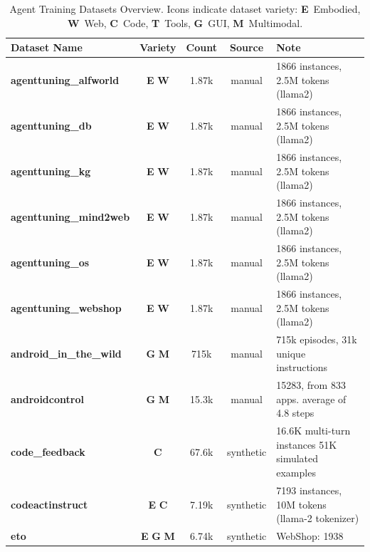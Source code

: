 \begin{table}[t]
    \caption{Agent Training Datasets Overview. Icons indicate dataset variety: \textbf{E}~Embodied, \textbf{W}~Web, \textbf{C}~Code, \textbf{T}~Tools, \textbf{G}~GUI, \textbf{M}~Multimodal.}
    \centering
    \small
    \setlength{\tabcolsep}{3pt}
    \begin{tabular*}{\textwidth}{@{\extracolsep{\fill}}l c c c p{5cm}}
        \toprule
        \textbf{Dataset Name} & \textbf{Variety} & \textbf{Count} & \textbf{Source} & \textbf{Note} \\
        \midrule
        \textbf{agenttuning\_alfworld \cite{agenttuning_alfworld_2310_12823}} & \textbf{E} \textbf{W} & 1.87k & manual & 1866 instances, 2.5M tokens (llama2) \\
        \textbf{agenttuning\_db \cite{agenttuning_db_2310_12823}} & \textbf{E} \textbf{W} & 1.87k & manual & 1866 instances, 2.5M tokens (llama2) \\
        \textbf{agenttuning\_kg \cite{agenttuning_kg_2310_12823}} & \textbf{E} \textbf{W} & 1.87k & manual & 1866 instances, 2.5M tokens (llama2) \\
        \textbf{agenttuning\_mind2web \cite{agenttuning_mind2web_2310_12823}} & \textbf{E} \textbf{W} & 1.87k & manual & 1866 instances, 2.5M tokens (llama2) \\
        \textbf{agenttuning\_os \cite{agenttuning_os_2310_12823}} & \textbf{E} \textbf{W} & 1.87k & manual & 1866 instances, 2.5M tokens (llama2) \\
        \textbf{agenttuning\_webshop \cite{agenttuning_webshop_2310_12823}} & \textbf{E} \textbf{W} & 1.87k & manual & 1866 instances, 2.5M tokens (llama2) \\
        \textbf{android\_in\_the\_wild \cite{android_in_the_wild_2307_10088}} & \textbf{G} \textbf{M} & 715k & manual & 715k episodes, 31k unique instructions \\
        \textbf{androidcontrol \cite{androidcontrol_2406_03679}} & \textbf{G} \textbf{M} & 15.3k & manual & 15283, from 833 apps. average of 4.8 steps \\
        \textbf{code\_feedback} & \textbf{C} & 67.6k & synthetic & 16.6K multi-turn instances
51K simulated examples \\
        \textbf{codeactinstruct \cite{codeactinstruct_2402_01030}} & \textbf{E} \textbf{C} & 7.19k & synthetic & 7193 instances, 10M tokens (llama-2 tokenizer) \\
        \textbf{eto \cite{eto_2403_02502}} & \textbf{E} \textbf{G} \textbf{M} & 6.74k & synthetic & WebShop: 1938

\end{tabular*}
\end{table}
